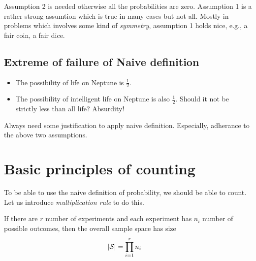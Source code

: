 \begin{multicols}{2}
    Assumption 2 is needed otherwise all the probabilities are zero. Assumption
    1 is a rather strong assumtion which is true in many cases but not all.
    Mostly in problems which involves some kind of {\em symmetry}, assumption 1
    holds nice, e.g., a fair coin, a fair dice.

    \subsection{Extreme of failure of Naive definition}
    \begin{itemize}
        \item The possibility of life on Neptune is $\frac{1}{2}$.
        \item The possibility of intelligent life on Neptune is also
            $\frac{1}{2}$. Should it not be strictly less than all life?
            Absurdity!
    \end{itemize}
    Always need some justification to apply naive definition. Especially,
    adherance to the above two assumptions.

    \section{Basic principles of counting}
    To be able to use the naive definition of probability, we should be able to
    count. Let us introduce {\em multiplication rule} to do this.

    \begin{proposition}
        If there are $r$ number of experiments and each experiment has $n_i$
        number of possible outcomes, then the overall sample space has size
        \begin{align}
            |\mathcal{S}| &= \prod\limits_{i=1}^r n_i
        \end{align}
    \end{proposition}


\end{multicols}
